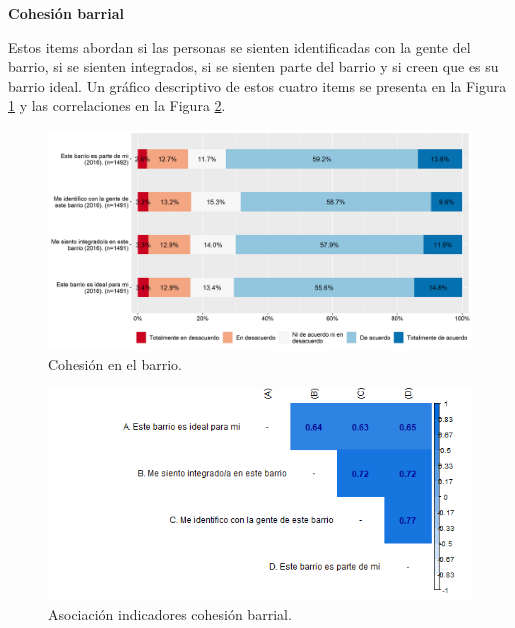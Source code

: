 \documentclass[
  12pt,
]{book}
\begin{document}
\textbf{Cohesión barrial}

Estos items abordan si las personas se sienten identificadas con la gente del barrio, si se sienten integrados, si se sienten parte del barrio y si creen que es su barrio ideal. Un gráfico descriptivo de estos cuatro items se presenta en la Figura \ref{fig:cohesion-barrial} y las correlaciones en la Figura \ref{fig:cohesion-barrial-cor}.

\begin{figure}[H]

{\centering \includegraphics[width=1\linewidth,height=1\textheight]{output/graphs/cohesion-barrial} 

}

\caption{Cohesión en el barrio.}\label{fig:cohesion-barrial}
\end{figure}

\begin{figure}[H]

{\centering \includegraphics[width=1\linewidth,height=1\textheight]{output/graphs/cohesion-barrial_cor} 

}

\caption{Asociación indicadores cohesión barrial.}\label{fig:cohesion-barrial-cor}
\end{figure}
\end{document}

